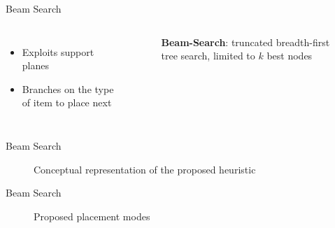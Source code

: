 \documentclass{beamer}
\begin{document}
    \begin{frame}{Beam Search}
        \begin{columns}[onlytextwidth,T]
        \column{\dimexpr\linewidth-75mm-5mm}
        \vspace{5mm}
        \begin{itemize}
            \item Exploits support planes
            \item Branches on the type of item to place next
        \end{itemize}
        \column{75mm}
            \begin{figure}[h]
                \caption*{\textbf{Beam-Search}: truncated breadth-first tree search, limited to $k$ best nodes}
                \resizebox*{\columnwidth}{!}{%
                
                }
            \end{figure}
        \end{columns}
    \end{frame}
    \begin{frame}{Beam Search}
        \begin{figure}[h]
            \resizebox*{!}{.7\textheight}{%
            
            }
            \caption{Conceptual representation of the proposed heuristic}
        \end{figure}
    \end{frame}
    \begin{frame}{Beam Search}
        \begin{figure}[h]
            \resizebox*{!}{.65\textheight}{%
            
            }
            \caption{Proposed placement modes}
        \end{figure}
    \end{frame}
\end{document}
